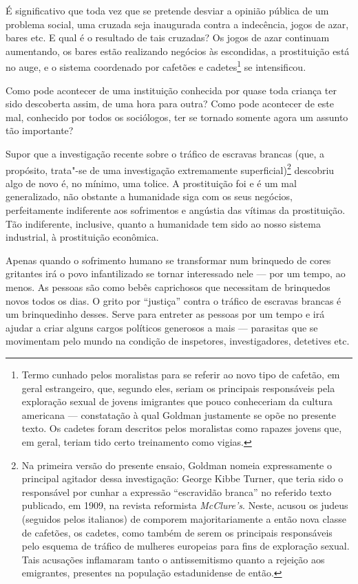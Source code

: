É significativo que toda vez que se pretende desviar a opinião pública
de um problema social, uma cruzada seja inaugurada contra a indecência,
jogos de azar, bares etc. E qual é o resultado de tais cruzadas? Os
jogos de azar continuam aumentando, os bares estão realizando negócios
às escondidas, a prostituição está no auge, e o sistema coordenado por
cafetões e cadetes\footnote{Termo cunhado pelos moralistas para se
  referir ao novo tipo de cafetão, em geral estrangeiro, que, segundo
  eles, seriam os principais responsáveis pela exploração sexual de
  jovens imigrantes que pouco conheceriam da cultura americana --- constatação à qual Goldman justamente se opõe no presente
  texto. Os cadetes foram descritos pelos moralistas como rapazes jovens
  que, em geral, teriam tido certo treinamento como vigias.} se
intensificou.

Como pode acontecer de uma instituição conhecida por quase toda criança
ter sido descoberta assim, de uma hora para outra? Como pode acontecer
de este mal, conhecido por todos os sociólogos, ter se tornado somente agora um
assunto tão importante?

Supor que a investigação recente sobre o tráfico de escravas brancas (que, a
propósito, trata"-se de uma investigação extremamente superficial)\footnote{Na
  primeira versão do presente ensaio, Goldman nomeia expressamente o principal agitador dessa investigação: George Kibbe Turner, que teria sido o responsável por cunhar a
  expressão ``escravidão branca'' no referido texto publicado, em 1909, na
  revista reformista \emph{McClure's}. Neste, acusou os judeus
  (seguidos pelos italianos) de comporem majoritariamente a então nova
  classe de cafetões, os cadetes, como também de serem os principais
  responsáveis pelo esquema de tráfico de mulheres europeias para fins
  de exploração sexual. Tais acusações inflamaram tanto o
  antissemitismo quanto a rejeição aos emigrantes, presentes na
  população estadunidense de então.} descobriu algo de novo é, no
mínimo, uma tolice. A prostituição foi e é um mal generalizado, não
obstante a humanidade siga com os seus negócios, perfeitamente
indiferente aos sofrimentos e angústia das vítimas da prostituição. Tão
indiferente, inclusive, quanto a humanidade tem sido ao nosso sistema
industrial, à prostituição econômica.

Apenas quando o sofrimento humano se transformar num brinquedo de cores
gritantes irá o povo infantilizado se tornar interessado nele --- por um
tempo, ao menos. As pessoas são como bebês caprichosos que necessitam de
brinquedos novos todos os dias. O grito por ``justiça'' contra o tráfico
de escravas brancas é um brinquedinho desses. Serve para entreter as
pessoas por um tempo e irá ajudar a criar alguns cargos políticos
generosos a mais --- parasitas que se movimentam pelo mundo na condição
de inspetores, investigadores, detetives etc.

